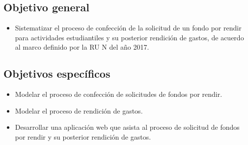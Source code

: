 \subsection{Objetivo general}
    \begin{itemize}
        \item Sistematizar el proceso de confección de la solicitud de un fondo por rendir para actividades estudiantiles y su posterior rendición de gastos, de acuerdo al marco definido por la RU N del año 2017.
    \end{itemize}

\subsection{Objetivos específicos} 
    \begin{itemize}
        \item Modelar el proceso de confección de solicitudes de fondos por rendir.

        \item Modelar el proceso de rendición de gastos.

        \item Desarrollar una aplicación web que asista al proceso de solicitud de fondos por rendir y su posterior rendición de gastos.

    \end{itemize}